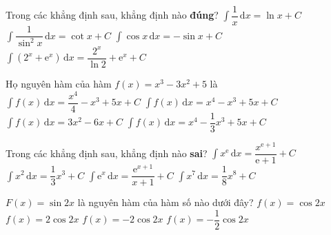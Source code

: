 \begin{ex}%
		Trong các khẳng định sau, khẳng định nào \textbf{đúng}?
	\choice
	{$\displaystyle\int \dfrac{1}{x} \mathrm{\,d}x = \ln {x} + C$}	
	{$\displaystyle\int \dfrac{1}{\sin^2 {x}} \mathrm{\,d}x = \cot {x} + C$}
	{$\displaystyle\int \cos {x} \mathrm{\,d}x = -\sin {x} + C$}
	{\True $\displaystyle\int \left(2^{x}+ \mathrm{e}^x\right) \mathrm{\,d}x = \dfrac{2^{x}}{\ln {2}}+ \mathrm{e}^x + C$}
\end{ex}
\begin{ex}%
	Họ nguyên hàm của hàm $f(x) = x^3 -3x^2 +5$ là 
	\choice
	{\True $\displaystyle\int f(x) \mathrm{\,d}x = \dfrac {x^4}{4} -x^3 + 5x + C$}	
	{$\displaystyle\int f(x) \mathrm{\,d}x = x^4 -x^3+5x+C$}
	{$\displaystyle\int f(x) \mathrm{\,d}x = 3x^2-6x + C$}
	{$\displaystyle\int f(x) \mathrm{\,d}x = x^4 - \dfrac{1}{3} x^3 +5x + C$}
\end{ex}
\begin{ex}%
	Trong các khẳng định sau, khẳng định nào \textbf{sai}?
	\choice
	{$\displaystyle\int x^{\mathrm{e}} \mathrm{\,d}x =\dfrac{x^{\mathrm{e}+1}}{\mathrm{e}+1} + C$}	
	{$\displaystyle\int x^2 \mathrm{\,d}x = \dfrac{1}{3} x^3 + C$}
	{\True $\displaystyle\int \mathrm {e}^{x} \mathrm{\,d}x = \dfrac{\mathrm{e}^{x+1}}{x+1} + C$}
	{$\displaystyle\int x^7 \mathrm{\,d}x = \dfrac{1}{8} x^8 + C$}
\end{ex}
\begin{ex}%
	$F(x)= \sin {2x}$ là nguyên hàm của hàm số nào dưới đây?
\choice
{$f(x)= \cos {2x}$}	
{\True $f(x)=2\cos {2x} $}
{$f(x)=-2 \cos {2x}$}
{$f(x) = -\dfrac{1}{2} \cos {2x}$}
\end{ex}

